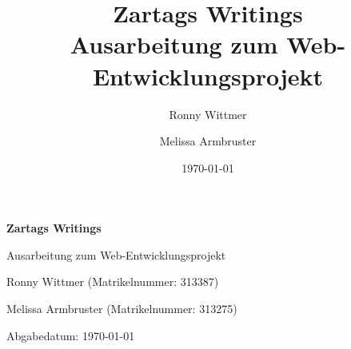 \documentclass[11pt,a4paper,oneside]{article}
\title{Zartags Writings\\Ausarbeitung zum Web-Entwicklungsprojekt}
\author{Ronny Wittmer \and Melissa Armbruster}
\date{\today}
\begin{document}
\begin{titlepage}
  \centering
  \vspace*{2cm}
  {\LARGE\bfseries Zartags Writings\par}
  \vspace{0.5cm}
  {\Large Ausarbeitung zum Web-Entwicklungsprojekt\par}
  \vspace{2cm}
  {\large
  Ronny Wittmer (Matrikelnummer: 313387)\par
  Melissa Armbruster (Matrikelnummer: 313275)\par}
  \vfill
  {\large Abgabedatum: \today\par}
\end{titlepage}

\tableofcontents
\newpage
\listoffigures
\listoftables
\renewcommand{\lstlistlistingname}{Codeverzeichnis}
\lstlistoflistings
\newpage








\appendix


\newpage
\printbibliography[heading=bibintoc, title={Literaturverzeichnis}]
\end{document}
